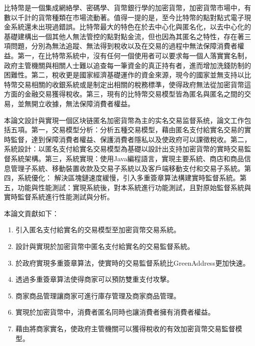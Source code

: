 
\begin{cabstract}

	比特幣是一個集成網絡學、密碼學、貨幣銀行學的加密貨幣，加密貨幣市場中，有數以千計的貨幣種類在市場流動著。值得一提的是，至今比特幣的點對點式電子現金系統還未出現過錯誤。比特幣最大的特色在於去中心化與匿名化，以去中心化的基礎建構出一個其他人無法管控的點對點金流，但也因為其匿名之特性，存在著三項問題，分別為無法追蹤、無法得到稅收以及在交易的過程中無法保障消費者權益。第一，在比特幣系統中，沒有任何一個使用者可以要求每一個人落實實名制，政府主管機關與相關人士難以追查每⼀筆資金的真正持有者，進而增加洗錢防制的困難性。第二，稅收更是國家經濟基礎運作的資金來源，現今的國家並無支持以比特幣交易相關的收銀系統或是制定出相關的稅務標準，使得政府無法從加密貨幣這方面的金融交易獲得稅收。第三，現有的比特幣交易模型皆為匿名與匿名之間的交易，並無開立收據，無法保障消費者權益。

	本論文設計與實現一個区块链匿名加密貨幣為主的实名交易监督系统，論文工作包括五項。第一，交易模型分析：分析五種交易模型，藉由匿名支付給實名交易的實時監督，達到保障消費者權益、保護消費者隱私以及使政府可以課徵稅收。第二，系統設計：以匿名支付給實名交易模型為基礎以設計出支持加密貨幣的實時交易監督系統架構。第三，系統實現：使用Java編程語言，實現主要系統、商店和商品信息管理子系統、移動裝置收款及交易子系統以及客戶端移動支付和交易子系統。第四，系統優化：
	解決區塊鏈速度緩慢，引入多重簽章算法構建實時監督系統。第五，功能與性能測試：實現系統後，對本系統進行功能測試，且對原始監督系統與實時監督系統進行性能測試與分析。

	本論文貢獻如下：
	\begin{enumerate}
		\item 引入匿名支付給實名的交易模型至加密貨幣交易系統。
		\item 設計與實現於加密貨幣中匿名支付給實名的交易監督系統。
		\item 於政府實現多重簽章算法，使實時的交易監督系統比GreenAddress更加快速。
		\item 透過多重簽章算法使得商家可以預防雙重支付攻擊。
		\item 商家商品管理讓商家可進行庫存管理及商家商品管理。
		\item 實現於加密貨幣中，消費者匿名同時也讓消費者擁有消費者權益。
		\item 藉由將商家實名，使政府主管機關可以獲得稅收的有效加密貨幣交易監督模型。
	\end{enumerate}


\end{cabstract}

